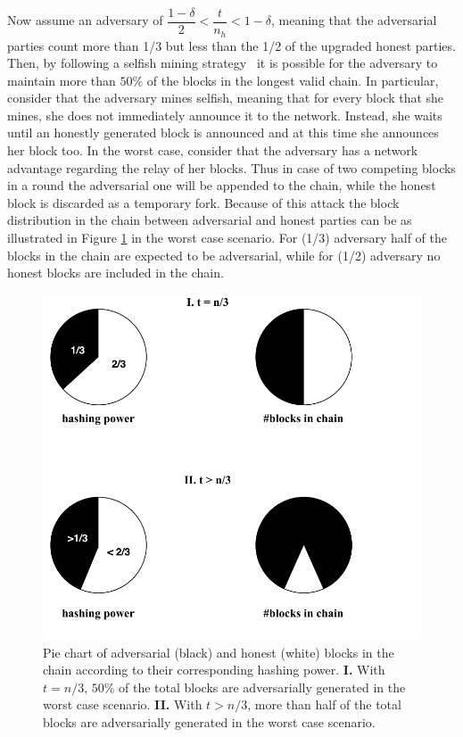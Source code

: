 Now assume an adversary of $ \dfrac{1-\delta}{2} < \dfrac{t}{n_h} < 1-\delta $, meaning that the adversarial parties count more than 1/3 but less than the 1/2 of the upgraded honest parties. Then, by following a selfish mining strategy~\cite{backbone}\cite{selfish} it
is possible for the adversary to maintain more than $50\%$ of the blocks in the longest valid chain. In particular,
consider that the adversary mines selfish, meaning that for every block that she mines,
she does not immediately announce it to the network. Instead, she waits until an honestly generated block is announced and at this time she announces her block too. In the worst case, consider that the adversary has a
network advantage regarding the relay of her blocks. Thus in case of two competing
blocks in a round the adversarial one will be appended to the chain, while the
honest block is discarded as a temporary fork. Because of this attack
the block distribution in the chain between adversarial and honest parties can be as illustrated in Figure
\ref{fig:selfish_mining_pie} in the worst case scenario. For (1/3) adversary half of the blocks in the
chain are expected to be adversarial, while for (1/2) adversary no honest blocks
are included in the chain.

\begin{figure}[h!]
	\begin{center}
		\includegraphics[scale=0.8]{figures/circles.pdf}
	\end{center}
	\caption{Pie chart of adversarial (black) and honest (white) blocks in 
	the chain according to their corresponding hashing power. \textbf{I.} With $t = n/3$, $50\%$ of the
	total blocks are adversarially generated in the worst case scenario. \textbf{II.}
	With $t > n/3$, more than half of the total blocks are adversarially generated in
	the worst case scenario.}
	\label{fig:selfish_mining_pie}
\end{figure}

